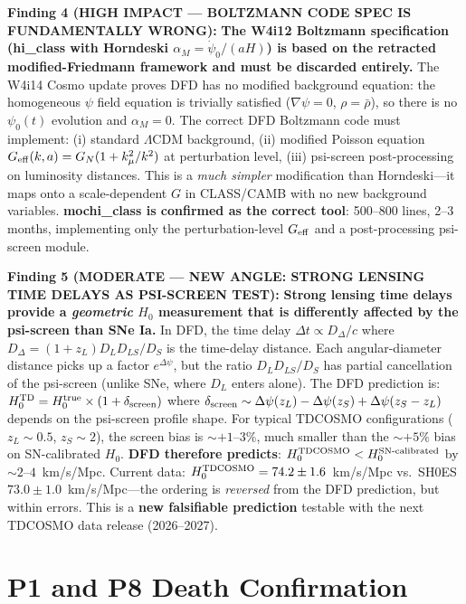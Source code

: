 \documentclass[11pt]{article}
\newcommand{\LCDM}{$\Lambda$CDM}
\newcommand{\Geff}{G_{\rm eff}}
\newcommand{\Dpsi}{\Delta\psi}
\begin{document}
\begin{tcolorbox}[colback=red!5!white, colframe=red!60!black,
  title=\textbf{TOP 5 FINDINGS --- W4i15}]
\textbf{Finding 4 (HIGH IMPACT --- BOLTZMANN CODE SPEC IS
FUNDAMENTALLY WRONG):}
\textbf{The W4i12 Boltzmann specification (hi\_class with Horndeski
$\alpha_M = \dot\psi_0/(aH)$) is based on the retracted
modified-Friedmann framework and must be discarded entirely.}
The W4i14 Cosmo update proves DFD has no modified background equation:
the homogeneous $\psi$ field equation is trivially satisfied ($\nabla\psi = 0$,
$\rho = \bar\rho$), so there is no $\psi_0(t)$ evolution and
$\alpha_M = 0$.  The correct DFD Boltzmann code must implement:
(i) standard \LCDM{} background, (ii) modified Poisson equation
$\Geff(k,a) = G_N(1 + k_\mu^2/k^2)$ at perturbation level,
(iii) psi-screen post-processing on luminosity distances.  This is a
\emph{much simpler} modification than Horndeski---it maps onto a
scale-dependent $G$ in CLASS/CAMB with no new background variables.
\textbf{mochi\_class is confirmed as the correct tool}: 500--800 lines,
2--3 months, implementing only the perturbation-level $\Geff$ and
a post-processing psi-screen module.

\textbf{Finding 5 (MODERATE --- NEW ANGLE: STRONG LENSING TIME DELAYS
AS PSI-SCREEN TEST):}
\textbf{Strong lensing time delays provide a \emph{geometric} $H_0$
measurement that is differently affected by the psi-screen than SNe Ia.}
In DFD, the time delay $\Delta t \propto D_\Delta/c$ where
$D_\Delta = (1+z_L) D_L D_{LS}/D_S$ is the time-delay distance.
Each angular-diameter distance picks up a factor $e^{\Dpsi}$, but
the ratio $D_L D_{LS}/D_S$ has partial cancellation of the psi-screen
(unlike SNe, where $D_L$ enters alone).  The DFD prediction is:
$H_0^{\rm TD} = H_0^{\rm true} \times (1 + \delta_{\rm screen})$
where $\delta_{\rm screen} \sim \Dpsi(z_L) - \Dpsi(z_S) + \Dpsi(z_S - z_L)$
depends on the psi-screen profile shape.  For typical TDCOSMO
configurations ($z_L \sim 0.5$, $z_S \sim 2$), the screen bias
is $\sim +1$--$3\%$, much smaller than the $\sim +5\%$ bias on
SN-calibrated $H_0$.  \textbf{DFD therefore predicts}:
$H_0^{\rm TDCOSMO} < H_0^{\rm SN\text{-}calibrated}$ by
$\sim 2$--$4$~km/s/Mpc.  Current data: $H_0^{\rm TDCOSMO} = 74.2
\pm 1.6$~km/s/Mpc vs.\ SH0ES $73.0 \pm 1.0$~km/s/Mpc---the ordering
is \emph{reversed} from the DFD prediction, but within errors.  This
is a \textbf{new falsifiable prediction} testable with the next
TDCOSMO data release (2026--2027).

\end{tcolorbox}


\part{P1 and P8 Death Confirmation}
\end{document}
